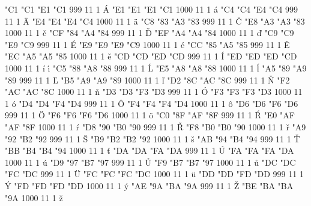 
  

\setcharcode  "C1  "C1  "E1  "C1   999  11  1  \texaccent \'A
\setcharcode  "E1  "E1  "E1  "C1  1000  11  1  \texaccent \'a
\setcharcode  "C4  "C4  "E4  "C4   999  11  1  \texaccent \"A
\setcharcode  "E4  "E4  "E4  "C4  1000  11  1  \texaccent \"a
\setcharcode  "C8  "83  "A3  "83   999  11  1  \texaccent \v C
\setcharcode  "E8  "A3  "A3  "83  1000  11  1  \texaccent \v c
\setcharcode  "CF  "84  "A4  "84   999  11  1  \texaccent \v D
\setcharcode  "EF  "A4  "A4  "84  1000  11  1  \texaccent \v d
\setcharcode  "C9  "C9  "E9  "C9   999  11  1  \texaccent \'E
\setcharcode  "E9  "E9  "E9  "C9  1000  11  1  \texaccent \'e
\setcharcode  "CC  "85  "A5  "85   999  11  1  \texaccent \v E
\setcharcode  "EC  "A5  "A5  "85  1000  11  1  \texaccent \v e
\setcharcode  "CD  "CD  "ED  "CD   999  11  1  \texaccent \'I
\setcharcode  "ED  "ED  "ED  "CD  1000  11  1  \texaccent \'i  \texaccent \'\i
\setcharcode  "C5  "88  "A8  "88   999  11  1  \texaccent \'L
\setcharcode  "E5  "A8  "A8  "88  1000  11  1  \texaccent \'l
\setcharcode  "A5  "89  "A9  "89   999  11  1  \texaccent \v L
\setcharcode  "B5  "A9  "A9  "89  1000  11  1  \texaccent \v l
\setcharcode  "D2  "8C  "AC  "8C   999  11  1  \texaccent \v N
\setcharcode  "F2  "AC  "AC  "8C  1000  11  1  \texaccent \v n
\setcharcode  "D3  "D3  "F3  "D3   999  11  1  \texaccent \'O
\setcharcode  "F3  "F3  "F3  "D3  1000  11  1  \texaccent \'o
\setcharcode  "D4  "D4  "F4  "D4   999  11  1  \texaccent \^O
\setcharcode  "F4  "F4  "F4  "D4  1000  11  1  \texaccent \^o
\setcharcode  "D6  "D6  "F6  "D6   999  11  1  \texaccent \"O
\setcharcode  "F6  "F6  "F6  "D6  1000  11  1  \texaccent \"o
\setcharcode  "C0  "8F  "AF  "8F   999  11  1  \texaccent \'R
\setcharcode  "E0  "AF  "AF  "8F  1000  11  1  \texaccent \'r
\setcharcode  "D8  "90  "B0  "90   999  11  1  \texaccent \v R
\setcharcode  "F8  "B0  "B0  "90  1000  11  1  \texaccent \v r
\setcharcode  "A9  "92  "B2  "92   999  11  1  \texaccent \v S
\setcharcode  "B9  "B2  "B2  "92  1000  11  1  \texaccent \v s
\setcharcode  "AB  "94  "B4  "94   999  11  1  \texaccent \v T
\setcharcode  "BB  "B4  "B4  "94  1000  11  1  \texaccent \v t
\setcharcode  "DA  "DA  "FA  "DA   999  11  1  \texaccent \'U
\setcharcode  "FA  "FA  "FA  "DA  1000  11  1  \texaccent \'u
\setcharcode  "D9  "97  "B7  "97   999  11  1  \texaccent \r U
\setcharcode  "F9  "B7  "B7  "97  1000  11  1  \texaccent \r u
\setcharcode  "DC  "DC  "FC  "DC   999  11  1  \texaccent \"U
\setcharcode  "FC  "FC  "FC  "DC  1000  11  1  \texaccent \"u
\setcharcode  "DD  "DD  "FD  "DD   999  11  1  \texaccent \'Y
\setcharcode  "FD  "FD  "FD  "DD  1000  11  1  \texaccent \'y
\setcharcode  "AE  "9A  "BA  "9A   999  11  1  \texaccent \v Z
\setcharcode  "BE  "BA  "BA  "9A  1000  11  1  \texaccent \v z


